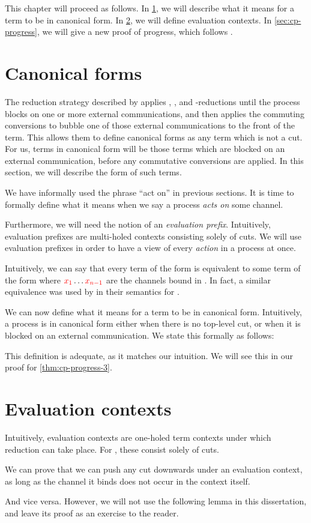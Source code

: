 This chapter will proceed as follows.
In \cref{sec:cp-canonical-forms}, we will describe what it means for a term to
be in canonical form.
In \cref{sec:cp-evaluation-contexts}, we will define evaluation contexts.
In \cref{sec:cp-progress}, we will give a new proof of progress, which follows
.

\section{Canonical forms}\label{sec:cp-canonical-forms}
The reduction strategy described by \citeauthor{lindley2015semantics} applies
, , and \textbeta-reductions until the process blocks on
one or more external communications, and then applies the commuting conversions
to bubble one of those external communications to the front of the term.
This allows them to define canonical forms as any term which is not a cut.
For us, terms in canonical form will be those terms which are blocked on an
external communication, before any commutative conversions are applied.
In this section, we will describe the form of such terms.

We have informally used the phrase ``act on'' in previous sections. It is time
to formally define what it means when we say a process \emph{acts on} some
channel.

Furthermore, we will need the notion of an \emph{evaluation prefix}.
Intuitively, evaluation prefixes are multi-holed contexts consisting solely of
cuts. We will use evaluation prefixes in order to have a view of every
\emph{action} in a process at once.

Intuitively, we can say that every term of the form
 is equivalent to some term of the form
where $\textcolor{red}{x_1} \dots \textcolor{red}{x_{n-1}}$ are the channels bound in .
In fact, a similar equivalence was used by \citeauthor{lindley2015semantics}
\cite{lindley2015semantics} in their semantics for \cp. 

We can now define what it means for a term to be in canonical form. Intuitively,
a process is in canonical form either when there is no top-level cut, or when it
is blocked on an external communication. We state this formally as follows:

This definition is adequate, as it matches our intuition. We will see this in
our proof for \cref{thm:cp-progress-3}.

\section{Evaluation contexts}\label{sec:cp-evaluation-contexts}
Intuitively, evaluation contexts are one-holed term contexts under which
reduction can take place. For \rcp, these consist solely of cuts.

We can prove that we can push any cut downwards under an evaluation context, as
long as the channel it binds does not occur in the context itself.

And vice versa. However, we will not use the following lemma in this
dissertation, and leave its proof as an exercise to the reader.


